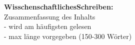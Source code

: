 

\myNewSection
\textbf{WisschenschaftlichesSchreiben:}
\\ Zusammenfassung des Inhalts
\\ - wird am häufigsten gelesen
\\ - max länge vorgegeben (150-300 Wörter)